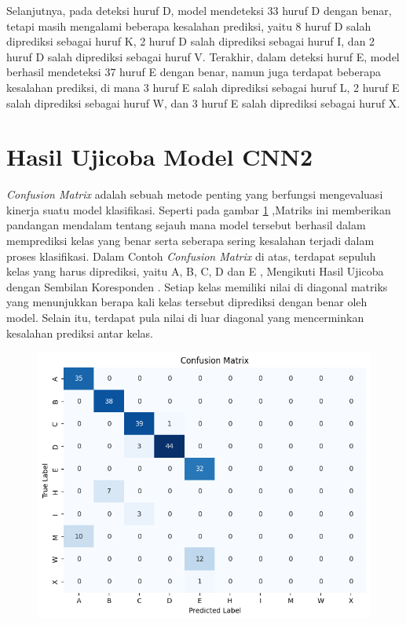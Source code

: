Selanjutnya, pada deteksi huruf D, model mendeteksi 33 huruf D dengan benar, tetapi masih mengalami beberapa kesalahan prediksi, yaitu 8 huruf D salah diprediksi sebagai huruf K, 2 huruf D salah diprediksi sebagai huruf I, dan 2 huruf D salah diprediksi sebagai huruf V. Terakhir, dalam deteksi huruf E, model berhasil mendeteksi 37 huruf E dengan benar, namun juga terdapat beberapa kesalahan prediksi, di mana 3 huruf E salah diprediksi sebagai huruf L, 2 huruf E salah diprediksi sebagai huruf W, dan 3 huruf E salah diprediksi sebagai huruf X.

\section{Hasil Ujicoba Model CNN2}
\textit{Confusion Matrix} adalah sebuah metode penting yang berfungsi mengevaluasi kinerja suatu model klasifikasi. Seperti pada gambar  \ref{fig:HasilUjicobaCNN2} ,Matriks ini memberikan pandangan mendalam tentang sejauh mana model tersebut berhasil dalam memprediksi kelas yang benar serta seberapa sering kesalahan terjadi dalam proses klasifikasi. Dalam Contoh \textit{Confusion Matrix} di atas, terdapat sepuluh kelas yang harus diprediksi, yaitu A, B, C, D dan E , Mengikuti Hasil Ujicoba dengan Sembilan Koresponden . Setiap kelas memiliki nilai di diagonal matriks yang menunjukkan berapa kali kelas tersebut diprediksi dengan benar oleh model. Selain itu, terdapat pula nilai di luar diagonal yang mencerminkan kesalahan prediksi antar kelas.

\begin{figure}[!hbt]
	\centering
	\includegraphics[width=0.7\linewidth]{gambar/bener/ConfusionMatrix-Ujicoba-CNN2.png}
	\label{fig:HasilUjicobaCNN2}
\end{figure}

